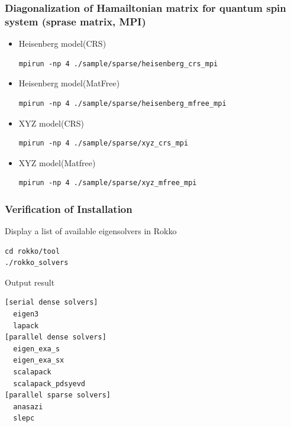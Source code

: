 \begin{frame}[c,fragile]
  \frametitle{Diagonalization of Hamailtonian matrix for quantum spin system (sprase matrix, MPI)}
  \begin{itemize}
  \item Heisenberg model(CRS) 
\begin{lstlisting}[style=shstyle]
mpirun -np 4 ./sample/sparse/heisenberg_crs_mpi
\end{lstlisting}
  \item Heisenberg model(MatFree) 
\begin{lstlisting}[style=shstyle]
mpirun -np 4 ./sample/sparse/heisenberg_mfree_mpi
\end{lstlisting}
  \item XYZ model(CRS) 
\begin{lstlisting}[style=shstyle]
mpirun -np 4 ./sample/sparse/xyz_crs_mpi
\end{lstlisting}
  \item XYZ model(Matfree) 
\begin{lstlisting}[style=shstyle]
mpirun -np 4 ./sample/sparse/xyz_mfree_mpi
\end{lstlisting}
  \end{itemize}
\end{frame}


\begin{frame}[c,fragile]
  \frametitle{Verification of Installation}
Display a list of available eigensolvers in Rokko\\
\begin{lstlisting}[style=shstyle]
cd rokko/tool
./rokko_solvers
\end{lstlisting}

Output result
\begin{lstlisting}[style=shstyle]
[serial dense solvers]
  eigen3
  lapack
[parallel dense solvers]
  eigen_exa_s
  eigen_exa_sx
  scalapack
  scalapack_pdsyevd
[parallel sparse solvers]
  anasazi
  slepc
\end{lstlisting}

\end{frame}



